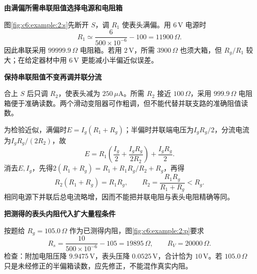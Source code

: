 \begin{solution}\textbf{由满偏所需串联阻值选择电源和电阻箱}\par\nobreak

图\ref{fig:c6:example:2:s}先断开 $S$，调 $R_1$ 使表头满偏。用 $6\,\mathrm V$ 电源时
\[
R_1\simeq\frac{6}{500\times10^{-6}}-100=11900\,\Omega.
\]
因此串联采用 $99999.9\,\Omega$ 电阻箱。若用 $2\,\mathrm V$，所需 $3900\,\Omega$ 也须大箱，但 $R_g/R_1$ 较大；在给定器材中用 $6\,\mathrm V$ 更能减小半偏近似误差。


\par\medskip{}\noindent\textbf{保持串联阻值不变再调并联分流}\par\nobreak

合上 $S$ 后只调 $R_2$，使表头减为 $250\,\mu\mathrm A$。所需 $R_2$ 接近 $100\,\Omega$，采用 $999.9\,\Omega$ 电阻箱便于准确读数。两个滑动变阻器可作粗调，但不能代替并联支路的准确阻值读数。

为检验近似，满偏时$E=I_g(R_1+R_g)$；半偏时并联端电压为$I_gR_g/2$，分流电流为$I_gR_g/(2R_2)$，故
\[
E=R_1\left(\frac{I_g}{2}+\frac{I_gR_g}{2R_2}\right)+\frac{I_gR_g}{2}.
\]
消去$E,I_g$，先得$2(R_1+R_g)=R_1+R_1R_g/R_2+R_g$，再得
\[
R_2(R_1+R_g)=R_1R_g,\qquad
R_2=\frac{R_1R_g}{R_1+R_g}<R_g.
\]
相同电源下并联后总电流略增，因而不能把并联电阻与表头电阻精确等同。


\par\medskip{}\noindent\textbf{把测得的表头内阻代入扩大量程条件}\par\nobreak


按题给 $R_g=105.0\,\Omega$ 作为已测得内阻，图\ref{fig:c6:example:2:p}要求
\[
R_s=\frac{10}{500\times10^{-6}}-105=19895\,\Omega,
\qquad R_V=20000\,\Omega.
\]
检查：附加电阻压降 $9.9475\,\mathrm V$，表头压降 $0.0525\,\mathrm V$，合计恰为 $10\,\mathrm V$。若 $105.0\,\Omega$ 只是未经修正的半偏箱读数，应先修正，不能混作真实内阻。
\end{solution}
